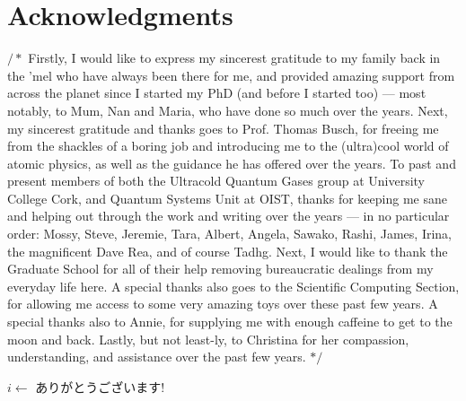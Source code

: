 \chapter*{Acknowledgments}

$/*$
Firstly, I would like to express my sincerest gratitude to my family back in the 'mel who have always been there for me, and provided amazing support from across the planet since I started my PhD (and before I started too) --- most notably, to Mum, Nan and Maria, who have done so much over the years. Next, my sincerest gratitude and thanks goes to Prof. Thomas Busch, for freeing me from the shackles of a boring job and introducing me to the (ultra)cool world of atomic physics, as well as the guidance he has offered over the years. To past and present members of both the Ultracold Quantum Gases group at University College Cork, and Quantum Systems Unit at OIST, thanks for keeping me sane and helping out through the work and writing over the years --- in no particular order: Mossy, Steve, Jeremie, Tara, Albert, Angela, Sawako, Rashi, James, Irina, the magnificent Dave Rea, and of course Tadhg. Next, I would like to thank the Graduate School for all of their help removing bureaucratic dealings from my everyday life here. A special thanks also goes to the Scientific Computing Section, for allowing me access to some very amazing toys over these past few years. A special thanks also to Annie, for supplying me with enough caffeine to get to the moon and back. Lastly, but not least-ly, to Christina for her compassion, understanding, and assistance over the past few years. $*/$


\begin{algorithmic}
    \State $i\gets$ ありがとうございます!
\EndFor
\end{algorithmic}
